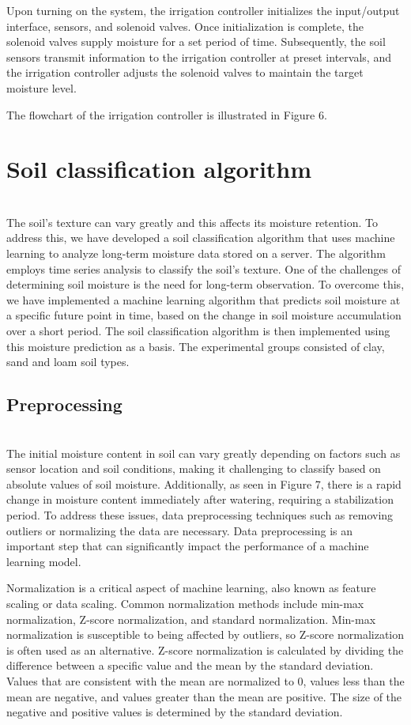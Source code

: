\documentclass[11pt]{article}
\begin{document}
Upon turning on the system, the irrigation controller initializes the input/output interface, sensors, and solenoid valves. Once initialization is complete, the solenoid valves supply moisture for a set period of time. Subsequently, the soil sensors transmit information to the irrigation controller at preset intervals, and the irrigation controller adjusts the solenoid valves to maintain the target moisture level.

The flowchart of the irrigation controller is illustrated in Figure 6.

\section{Soil classification algorithm}
\indent \\The soil's texture can vary greatly and this affects its moisture retention. To address this, we have developed a soil classification algorithm that uses machine learning to analyze long-term moisture data stored on a server. The algorithm employs time series analysis to classify the soil's texture. One of the challenges of determining soil moisture is the need for long-term observation. To overcome this, we have implemented a machine learning algorithm that predicts soil moisture at a specific future point in time, based on the change in soil moisture accumulation over a short period. The soil classification algorithm is then implemented using this moisture prediction as a basis. The experimental groups consisted of clay, sand and loam soil types.

\subsection{Preprocessing}
\indent \\The initial moisture content in soil can vary greatly depending on factors such as sensor location and soil conditions, making it challenging to classify based on absolute values of soil moisture. Additionally, as seen in Figure 7, there is a rapid change in moisture content immediately after watering, requiring a stabilization period. To address these issues, data preprocessing techniques such as removing outliers or normalizing the data are necessary. Data preprocessing is an important step that can significantly impact the performance of a machine learning model.

Normalization is a critical aspect of machine learning, also known as feature scaling or data scaling. Common normalization methods include min-max normalization, Z-score normalization, and standard normalization. Min-max normalization is susceptible to being affected by outliers, so Z-score normalization is often used as an alternative. Z-score normalization is calculated by dividing the difference between a specific value and the mean by the standard deviation. Values that are consistent with the mean are normalized to 0, values less than the mean are negative, and values greater than the mean are positive. The size of the negative and positive values is determined by the standard deviation.
\end{document}
